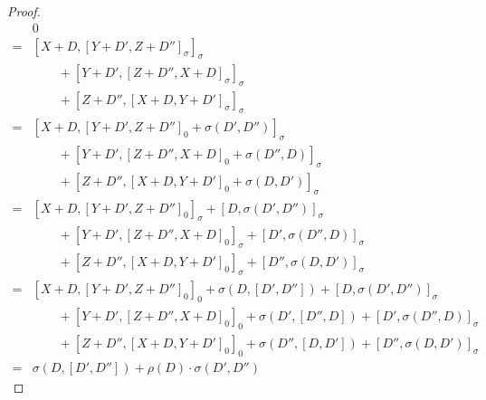 \begin{proof}
                    $$
                        \begin{aligned}
                            & 0
                            \\
                            = &
                                [ X + D, [Y + D', Z + D'']_{\sigma} ]_{\sigma}
                                \\
                                & \qquad + [ Y + D', [Z + D'', X + D]_{\sigma} ]_{\sigma}
                                \\
                                & \qquad + [ Z + D'', [X + D, Y + D']_{\sigma} ]_{\sigma}
                            \\
                            = &
                                [ X + D, [Y + D', Z + D'']_0 + \sigma(D', D'') ]_{\sigma}
                                \\
                                & \qquad + [ Y + D', [Z + D'', X + D]_0 + \sigma(D'', D) ]_{\sigma}
                                \\
                                & \qquad + [ Z + D'', [X + D, Y + D']_0 + \sigma(D, D') ]_{\sigma}
                            \\
                            = & 
                                [ X + D, [Y + D', Z + D'']_0 ]_{\sigma} + [D, \sigma(D', D'')]_{\sigma}
                                \\
                                & \qquad + [ Y + D', [Z + D'', X + D]_0 ]_{\sigma} + [D', \sigma(D'', D)]_{\sigma}
                                \\
                                & \qquad + [ Z + D'', [X + D, Y + D']_0 ]_{\sigma} + [D'', \sigma(D, D')]_{\sigma}
                            \\
                            = &
                                [ X + D, [Y + D', Z + D'']_0 ]_0 + \sigma(D, [D', D'']) + [D, \sigma(D', D'')]_{\sigma}
                                \\
                                & \qquad + [ Y + D', [Z + D'', X + D]_0 ]_0 + \sigma(D', [D'', D]) + [D', \sigma(D'', D)]_{\sigma}
                                \\
                                & \qquad + [ Z + D'', [X + D, Y + D']_0 ]_0 + \sigma(D'', [D, D']) + [D'', \sigma(D, D')]_{\sigma}
                            \\
                            = &
                                \sigma(D, [D', D'']) + \rho(D) \cdot \sigma(D', D'')

\end{aligned}$$
\end{proof}
